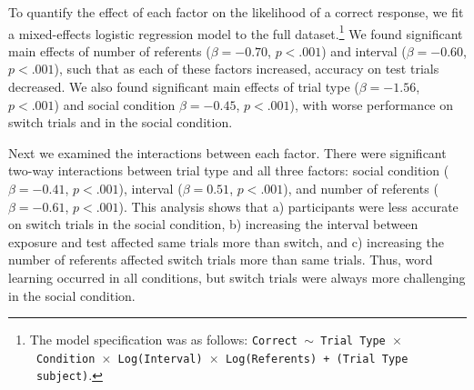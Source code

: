 \documentclass[10pt,letterpaper]{article}
\begin{document}
To quantify the effect of each factor on the likelihood of a correct response, we fit a mixed-effects logistic regression model to the full dataset.\footnote{The model specification was as follows: \texttt{Correct $\sim$ Trial Type~$\times$~Condition~$\times$~Log(Interval)~$\times$~Log(Referents) + (Trial Type \textbar~subject)}.} We found significant main effects of number of referents ($\beta= -0.70$, $p< .001$) and interval ($\beta= -0.60$, $p< .001$), such that as each of these factors increased, accuracy on test trials decreased. We also found significant main effects of trial type ($\beta= -1.56$, $p< .001$) and social condition $\beta= -0.45$, $p< .001$), with worse performance on switch trials and in the social condition. 

Next we examined the interactions between each factor. There were significant two-way interactions between trial type and all three factors: social condition ($\beta= -0.41$, $p< .001$), interval ($\beta= 0.51$, $p< .001$), and number of referents ($\beta=-0.61$, $p< .001$). This analysis shows that a) participants were less accurate on switch trials in the social condition, b) increasing the interval between exposure and test affected same trials more than switch, and c) increasing the number of referents affected switch trials more than same trials. Thus, word learning occurred in all conditions, but switch trials were always more challenging in the social condition.
\end{document}
